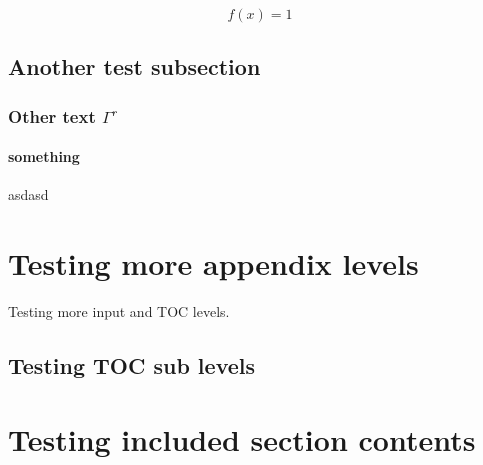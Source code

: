 \begin{equation}
  \label{eq:test equation label}
  f(x) = 1
\end{equation}

\subsection{Another test subsection}

\subsubsection{Other text $\Gamma^{r}$}

\paragraph{something}
asdasd

\section{Testing more appendix levels}
Testing more input and TOC levels.

\subsection{Testing TOC sub levels}

\section{Testing included section contents}



